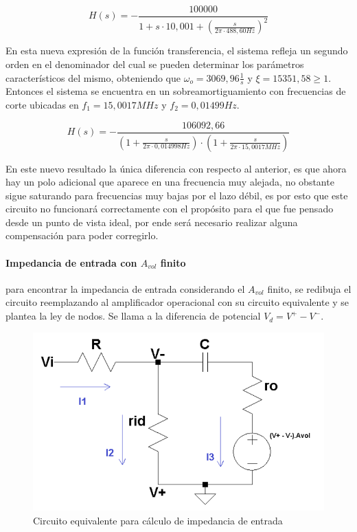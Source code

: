 \begin{equation*}
	H(s) = - \frac{100000}{1 + s \cdot 10,001 + \left( \frac{s}{2 \pi \cdot 488,60Hz} \right)^{2}}
\end{equation*}

En esta nueva expresi\'on de la funci\'on transferencia, el sistema refleja un segundo orden en el denominador del cual se pueden determinar los par\'ametros caracter\'isticos del mismo, obteniendo que $\omega_o = 3069,96 \frac{1}{s}$ y $\xi = 15351,58 \geq 1$. Entonces el sistema se encuentra en un sobreamortiguamiento con frecuencias de corte ubicadas en $f_1 = 15,0017MHz$ y $f_2 = 0,01499Hz$.

\begin{equation}
	H(s) = - \frac{106092,66}{(1 + \frac{s}{2 \pi \cdot 0,014998Hz}) \cdot (1 + \frac{s}{2 \pi \cdot 15,0017MHz})}
	\label{eq:integrador_transfer_polo_dominante}
\end{equation}

En este nuevo resultado la \'unica diferencia con respecto al anterior, es que ahora hay un polo adicional que aparece en una frecuencia muy alejada, no obstante sigue saturando para frecuencias muy bajas por el lazo d\'ebil, es por esto que este circuito no funcionar\'a correctamente con el prop\'osito para el que fue pensado desde un punto de vista ideal, por ende ser\'a necesario realizar alguna compensaci\'on para poder corregirlo.

\paragraph*{Impedancia de entrada con $A_{vol}$ finito} para encontrar la impedancia de entrada considerando el $A_{vol}$ finito, se redibuja el circuito reemplazando al amplificador operacional con su circuito equivalente y se plantea la ley de nodos.
Se llama a la diferencia de potencial $V_d = V^{+} - V^{-}$.

\begin{figure}[H]
	\centering
	\includegraphics[scale=0.7]{Recursos/Integrador/Circuito_integrador_modelo_impedancia.png}
	\caption{Circuito equivalente para c\'alculo de impedancia de entrada}
	\label{fig:integrador_modelo}
\end{figure}

